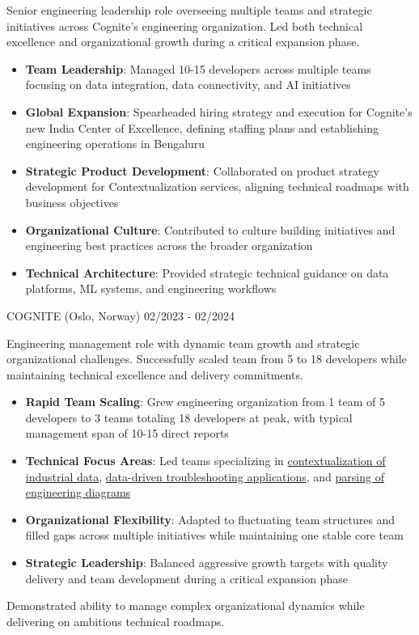 \documentclass[singlesided,
               paper=a4,
               fontsize=10pt
              ]{my-resume}
\begin{document}
    {
        Senior engineering leadership role overseeing multiple teams and strategic initiatives across Cognite's engineering organization. Led both technical excellence and organizational growth during a critical expansion phase.

        \begin{itemize}[leftmargin=2em]
            \item \textbf{Team Leadership}: Managed 10-15 developers across multiple teams focusing on data integration, data connectivity, and AI initiatives
            \item \textbf{Global Expansion}: Spearheaded hiring strategy and execution for Cognite's new India Center of Excellence, defining staffing plans and establishing engineering operations in Bengaluru
            \item \textbf{Strategic Product Development}: Collaborated on product strategy development for Contextualization services, aligning technical roadmaps with business objectives
            \item \textbf{Organizational Culture}: Contributed to culture building initiatives and engineering best practices across the broader organization
            \item \textbf{Technical Architecture}: Provided strategic technical guidance on data platforms, ML systems, and engineering workflows
        \end{itemize}


    }
%
	{COGNITE (Oslo, Norway)}
	{02/2023 - 02/2024}
    {
        Engineering management role with dynamic team growth and strategic organizational challenges. Successfully scaled team from 5 to 18 developers while maintaining technical excellence and delivery commitments.

        \begin{itemize}[leftmargin=2em]
            \item \textbf{Rapid Team Scaling}: Grew engineering organization from 1 team of 5 developers to 3 teams totaling 18 developers at peak, with typical management span of 10-15 direct reports
            \item \textbf{Technical Focus Areas}: Led teams specializing in \href{https://www.cognite.com/en/contextualization}{contextualization of industrial data}, \href{https://www.cognite.com/en/industrial-canvas}{data-driven troubleshooting applications}, and \href{https://docs.cognite.com/cdf/integration/guides/contextualization/interactive_diagrams/}{parsing of engineering diagrams}
            \item \textbf{Organizational Flexibility}: Adapted to fluctuating team structures and filled gaps across multiple initiatives while maintaining one stable core team
            \item \textbf{Strategic Leadership}: Balanced aggressive growth targets with quality delivery and team development during a critical expansion phase
        \end{itemize}

        Demonstrated ability to manage complex organizational dynamics while delivering on ambitious technical roadmaps.
    }
\end{document}
